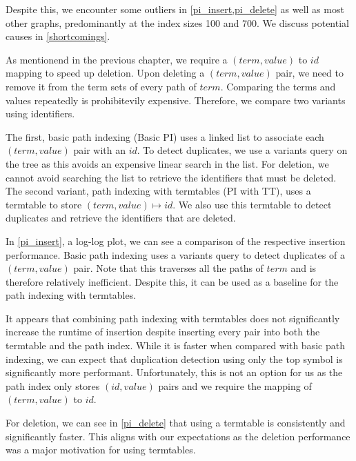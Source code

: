 Despite this, we encounter some outliers in \cref{pi_insert,pi_delete} as well as most other graphs, predominantly at the index sizes 100 and 700. We discuss potential causes in \cref{shortcomings}.

As mentionend in the previous chapter, we require a $(term,value)$ to $id$ mapping to speed up deletion. Upon deleting a $(term,value)$ pair, we need to remove it from the term sets of every path of $term$. Comparing the terms and values repeatedly is prohibitevily expensive. Therefore, we compare two variants using identifiers.

The first, basic path indexing (Basic PI) uses a linked list to associate each $(term,value)$ pair with an $id$. To detect duplicates, we use a variants query on the tree as this avoids an expensive linear search in the list. For deletion, we cannot avoid searching the list to retrieve the identifiers that must be deleted. The second variant, path indexing with termtables (PI with TT), uses a termtable to store $(term,value) \mapsto id$. We also use this termtable to detect duplicates and retrieve the identifiers that are deleted.

In \cref{pi_insert}, a log-log plot, we can see a comparison of the respective insertion performance. Basic path indexing uses a variants query to detect duplicates of a $(term,value)$ pair. Note that this traverses all the paths of $term$ and is therefore relatively inefficient. Despite this, it can be used as a baseline for the path indexing with termtables.

It appears that combining path indexing with termtables does not significantly increase the runtime of insertion despite inserting every pair into both the termtable and the path index. While it is faster when compared with basic path indexing, we can expect that duplication detection using only the top symbol is significantly more performant. Unfortunately, this is not an option for us as the path index only stores $(id,value)$ pairs and we require the mapping of $(term,value)$ to $id$.

For deletion, we can see in \cref{pi_delete} that using a termtable is consistently and significantly faster. This aligns with our expectations as the deletion performance was a major motivation for using termtables.

